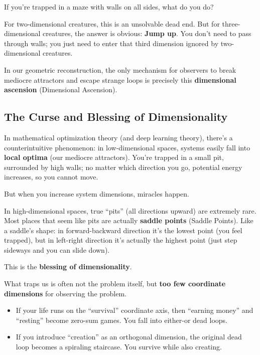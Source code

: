 \documentclass[11pt,a4paper,twoside]{book}
\begin{document}
If you're trapped in a maze with walls on all sides, what do you do?

For two-dimensional creatures, this is an unsolvable dead end. But for three-dimensional creatures, the answer is obvious: \textbf{Jump up}. You don't need to pass through walls; you just need to enter that third dimension ignored by two-dimensional creatures.

In our geometric reconstruction, the only mechanism for observers to break mediocre attractors and escape strange loops is precisely this \textbf{dimensional ascension} (Dimensional Ascension).

\subsection{The Curse and Blessing of Dimensionality}

In mathematical optimization theory (and deep learning theory), there's a counterintuitive phenomenon: in low-dimensional spaces, systems easily fall into \textbf{local optima} (our mediocre attractors). You're trapped in a small pit, surrounded by high walls; no matter which direction you go, potential energy increases, so you cannot move.

But when you increase system dimensions, miracles happen.

In high-dimensional spaces, true ``pits'' (all directions upward) are extremely rare. Most places that seem like pits are actually \textbf{saddle points} (Saddle Points). Like a saddle's shape: in forward-backward direction it's the lowest point (you feel trapped), but in left-right direction it's actually the highest point (just step sideways and you can slide down).

This is the \textbf{blessing of dimensionality}.

What traps us is often not the problem itself, but \textbf{too few coordinate dimensions} for observing the problem.

\begin{itemize}
\item If your life runs on the ``survival'' coordinate axis, then ``earning money'' and ``resting'' become zero-sum games. You fall into either-or dead loops.

\item If you introduce ``creation'' as an orthogonal dimension, the original dead loop becomes a spiraling staircase. You survive while also creating.
\end{itemize}
\end{document}
